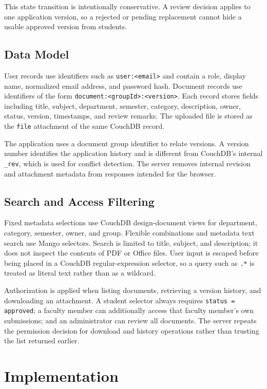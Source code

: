 \documentclass[conference]{IEEEtran}
\begin{document}
This state transition is intentionally conservative. A review decision applies to one application version, so a rejected or pending replacement cannot hide a usable approved version from students.

\subsection{Data Model}
User records use identifiers such as \texttt{user:<email>} and contain a role, display name, normalized email address, and password hash. Document records use identifiers of the form \texttt{document:<groupId>:<version>}. Each record stores fields including title, subject, department, semester, category, description, owner, status, version, timestamps, and review remarks. The uploaded file is stored as the \texttt{file} attachment of the same CouchDB record.

The application uses a document group identifier to relate versions. A version number identifies the application history and is different from CouchDB's internal \texttt{\_rev}, which is used for conflict detection. The server removes internal revision and attachment metadata from responses intended for the browser.

\subsection{Search and Access Filtering}
Fixed metadata selections use CouchDB design-document views for department, category, semester, owner, and group. Flexible combinations and metadata text search use Mango selectors. Search is limited to title, subject, and description; it does not inspect the contents of PDF or Office files. User input is escaped before being placed in a CouchDB regular-expression selector, so a query such as \texttt{.*} is treated as literal text rather than as a wildcard.

Authorization is applied when listing documents, retrieving a version history, and downloading an attachment. A student selector always requires \texttt{status = approved}; a faculty member can additionally access that faculty member's own submissions; and an administrator can review all documents. The server repeats the permission decision for download and history operations rather than trusting the list returned earlier.

\section{Implementation}
\end{document}
